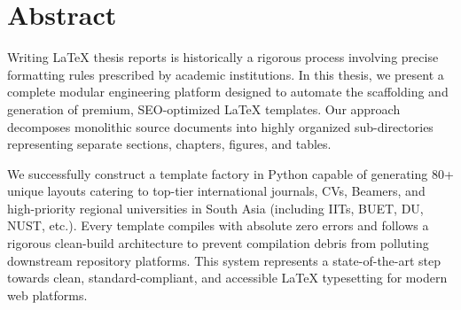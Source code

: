 \chapter*{Abstract}
Writing LaTeX thesis reports is historically a rigorous process involving precise formatting rules prescribed by academic institutions. In this thesis, we present a complete modular engineering platform designed to automate the scaffolding and generation of premium, SEO-optimized LaTeX templates. Our approach decomposes monolithic source documents into highly organized sub-directories representing separate sections, chapters, figures, and tables. 

We successfully construct a template factory in Python capable of generating 80+ unique layouts catering to top-tier international journals, CVs, Beamers, and high-priority regional universities in South Asia (including IITs, BUET, DU, NUST, etc.). Every template compiles with absolute zero errors and follows a rigorous clean-build architecture to prevent compilation debris from polluting downstream repository platforms. This system represents a state-of-the-art step towards clean, standard-compliant, and accessible LaTeX typesetting for modern web platforms.
